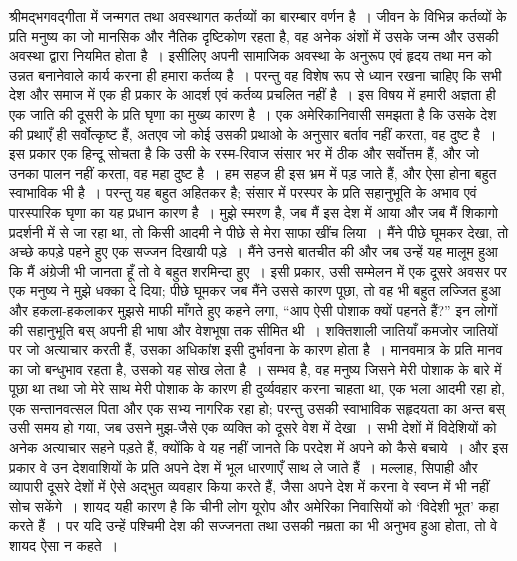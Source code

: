 श्रीमद्भगवद्गीता में जन्मगत तथा अवस्थागत कर्तव्यों का बारम्बार वर्णन है~। जीवन के विभिन्न कर्तव्यों के प्रति मनुष्य का जो मानसिक और नैतिक दृष्टिकोण रहता है, वह अनेक अंशों में उसके जन्म और उसकी अवस्था द्वारा नियमित होता है~। इसीलिए अपनी सामाजिक अवस्था के अनुरूप एवं हृदय तथा मन को उन्नत बनानेवाले कार्य करना ही हमारा कर्तव्य है~। परन्तु वह विशेष रूप से ध्यान रखना चाहिए कि सभी देश और समाज में एक ही प्रकार के आदर्श एवं कर्तव्य प्रचलित नहीं है~। इस विषय में हमारी अज्ञता ही एक जाति की दूसरी के प्रति घृणा का मुख्य कारण है~। एक अमेरिकानिवासी समझता है कि उसके देश की प्रथाएँ ही सर्वोत्कृष्ट हैं, अतएव जो कोई उसकी प्रथाओ के अनुसार बर्ताव नहीं करता, वह दुष्ट है~। इस प्रकार एक हिन्दू सोचता है कि उसी के रस्म-रिवाज संसार भर में ठीक और सर्वोत्तम हैं, और जो उनका पालन नहीं करता, वह महा दुष्ट है~। हम सहज ही इस भ्रम में पड़ जाते हैं, और ऐसा होना बहुत स्वाभाविक भी है~। परन्तु यह बहुत अहितकर है; संसार में परस्पर के प्रति सहानुभूति के अभाव एवं पारस्पारिक घृणा का यह प्रधान कारण है~। मुझे स्मरण है, जब मैं इस देश में आया और जब मैं शिकागो प्रदर्शनी में से जा रहा था, तो किसी आदमी ने पीछे से मेरा साफा खींच लिया~। मैंने पीछे घूमकर देखा, तो अच्छे कपड़े पहने हुए एक सज्जन दिखायी पड़े~। मैंने उनसे बातचीत की और जब उन्हें यह मालूम हुआ कि मैं अंग्रेजी भी जानता हूँ तो वे बहुत शरमिन्दा हुए~। इसी प्रकार, उसी सम्मेलन में एक दूसरे अवसर पर एक मनुष्य ने मुझे धक्का दे दिया; पीछे घूमकर जब मैंने उससे कारण पूछा, तो वह भी बहुत लज्जित हुआ और हकला-हकलाकर मुझसे माफी माँगते हुए कहने लगा, “आप ऐसी पोशाक क्यों पहनते हैं?” इन लोगों की सहानुभूति बस् अपनी ही भाषा और वेशभूषा तक सीमित थी~। शक्तिशाली जातियाँ कमजोर जातियों पर जो अत्याचार करती हैं, उसका अधिकांश इसी दुर्भावना के कारण होता है~। मानवमात्र के प्रति मानव का जो बन्धुभाव रहता है, उसको यह सोख लेता है~। सम्भव है, वह मनुष्य जिसने मेरी पोशाक के बारे में पूछा था तथा जो मेरे साथ मेरी पोशाक के कारण ही दुर्व्यवहार करना चाहता था, एक भला आदमी रहा हो, एक सन्तानवत्सल पिता और एक सभ्य नागरिक रहा हो; परन्तु उसकी स्वाभाविक सहृदयता का अन्त बस् उसी समय हो गया, जब उसने मुझ-जैसे एक व्यक्ति को दूसरे वेश में देखा~। सभी देशों में विदेशियों को अनेक अत्याचार सहने पड़ते हैं, क्योंकि वे यह नहीं जानते कि परदेश में अपने को कैसे बचाये~। और इस प्रकार वे उन देशवाशियों के प्रति अपने देश में भूल धारणाएँ साथ ले जाते हैं~। मल्लाह, सिपाही और व्यापारी दूसरे देशों में ऐसे अद्भुत व्यवहार किया करते हैं, जैसा अपने देश में करना वे स्वप्न में भी नहीं सोच सकेंगे~। शायद यही कारण है कि चीनी लोग यूरोप और अमेरिका निवासियों को ‘विदेशी भूत’ कहा करते हैं~। पर यदि उन्हें पश्चिमी देश की सज्जनता तथा उसकी नम्रता का भी अनुभव हुआ होता, तो वे शायद ऐसा न कहते~।


